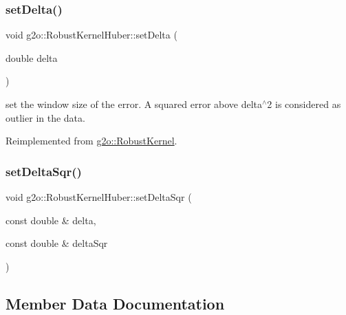 \mbox{\label{classg2o_1_1_robust_kernel_huber_a7e9ee4bbc9483dcd3d10a4c1f506a4d2}} 
\subsubsection{\texorpdfstring{set\+Delta()}{setDelta()}}
{\footnotesize\ttfamily void g2o\+::\+Robust\+Kernel\+Huber\+::set\+Delta (\begin{DoxyParamCaption}\item[{double}]{delta }\end{DoxyParamCaption})\hspace{0.3cm}{\ttfamily [virtual]}}

set the window size of the error. A squared error above delta$^\wedge$2 is considered as outlier in the data. 

Reimplemented from \mbox{\hyperlink{classg2o_1_1_robust_kernel_a8d85269635c436fca51324d7cb16a798}{g2o\+::\+Robust\+Kernel}}.

\mbox{\label{classg2o_1_1_robust_kernel_huber_ad243b5888d71a3573e9f9372abead870}} 
\subsubsection{\texorpdfstring{set\+Delta\+Sqr()}{setDeltaSqr()}}
{\footnotesize\ttfamily void g2o\+::\+Robust\+Kernel\+Huber\+::set\+Delta\+Sqr (\begin{DoxyParamCaption}\item[{const double \&}]{delta,  }\item[{const double \&}]{delta\+Sqr }\end{DoxyParamCaption})\hspace{0.3cm}{\ttfamily [virtual]}}



\subsection{Member Data Documentation}
\mbox{\label{classg2o_1_1_robust_kernel_huber_ada9d48b59d64f72c18b11905de8dca0d}} 
